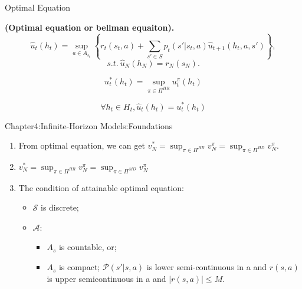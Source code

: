 \documentclass{beamer}
\begin{document}
\begin{frame}[t]{Optimal Equation}
    \begin{definition} \textbf{(Optimal equation or bellman equaiton).}
        \[
           \hat u_t(h_t) = \sup_{a \in A_{s_t}} \left\{ r_t(s_t, a) + \sum^{}_{s' \in S} p_t(s' | s_t, a) \hat u_{t+1} (h_t, a, s') \right\},
        \]
        \[
            s.t.\ \hat u_N(h_N) = r_N(s_N). 
        \]
    \end{definition}
    \begin{definition}
        \[
             u^*_t(h_t) = \sup_{\pi \in \Pi^{HR}} u^\pi_t(h_t) 
        \]
    \end{definition}
    \begin{theorem}
        \[
             \forall h_t \in H_t, \hat u_t(h_t) = u^*_t(h_t) 
        \]
    \end{theorem}
\end{frame}

\begin{frame}[t]{Chapter4:Infinite-Horizon Models:Foundations}
    \begin{enumerate}
        \item From optimal equation, we can get $ v^*_{N} = \sup_{\pi \in \Pi^{HR}} v^\pi_{N} = \sup_{\pi \in \Pi^{HD}} v^\pi_{N} $.
        \item $  v^*_{N} = \sup_{\pi \in \Pi^{HR}} v^\pi_{N} = \sup_{\pi \in \Pi^{MD}} v^\pi_{N}  $ 
        \item The condition of attainable optimal equation:
            \begin{itemize}
                \item $ \mathcal{S} $ is discrete;
                \item $ \mathcal{A} $: 
                    \begin{itemize}
                        \item $ A_s $ is countable, or;
                        \item $ A_s $ is compact; $ \mathcal{P}(s' | s, a) $ is lower semi-continuous in a and $ r(s,a) $ is upper semicontinuous in a and $ \left| r(s, a) \right| \le M $.
                    \end{itemize}
            \end{itemize}
    \end{enumerate}
\end{frame}
\end{document}
